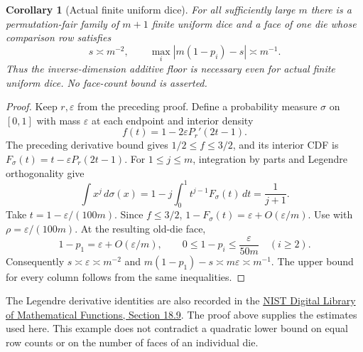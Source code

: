 \documentclass[11pt]{article}
\newtheorem{corollary}{Corollary}
\begin{document}
\begin{corollary}[Actual finite uniform dice]
For all sufficiently large $m$ there is a permutation-fair family of
$m+1$ finite uniform dice and a face of one die whose comparison row
satisfies
\[
 s\asymp m^{-2},\qquad
 \max_i|m(1-p_i)-s|\asymp m^{-1}.
\]
Thus the inverse-dimension additive floor is necessary even for
actual finite uniform dice. No face-count bound is asserted.
\end{corollary}
\begin{proof}
Keep $r,\varepsilon$ from the preceding proof. Define a probability
measure $\sigma$ on $[0,1]$ with mass $\varepsilon$ at each endpoint
and interior density
\[
 f(t)=1-2\varepsilon P_r'(2t-1).
\]
The preceding derivative bound gives $1/2\le f\le3/2$, and its
interior CDF is $F_\sigma(t)=t-\varepsilon P_r(2t-1)$.
For $1\le j\le m$, integration by parts and Legendre orthogonality
give
\[
 \int x^j\,d\sigma(x)
 =1-j\int_0^1t^{j-1}F_\sigma(t)\,dt
 =\frac1{j+1}.
\]
Take $t=1-\varepsilon/(100m)$. Since $f\le3/2$,
$1-F_\sigma(t)=\varepsilon+O(\varepsilon/m)$.
Use  with
$\rho=\varepsilon/(100m)$. At the resulting old-die face,
\[
 1-p_1=\varepsilon+O(\varepsilon/m),\qquad
 0\le1-p_i\le\frac{\varepsilon}{50m}\quad(i\ge2).
\]
Consequently $s\asymp\varepsilon\asymp m^{-2}$ and
$m(1-p_1)-s\asymp m\varepsilon\asymp m^{-1}$.
The upper bound for every column follows from the same inequalities.
\end{proof}

The Legendre derivative identities are also recorded in the
\href{https://dlmf.nist.gov/18.9}{NIST Digital Library of Mathematical
Functions, Section 18.9}. The proof above supplies the estimates used
here. This example does not contradict a quadratic lower bound on
equal row counts or on the number of faces of an individual die.
\end{document}
